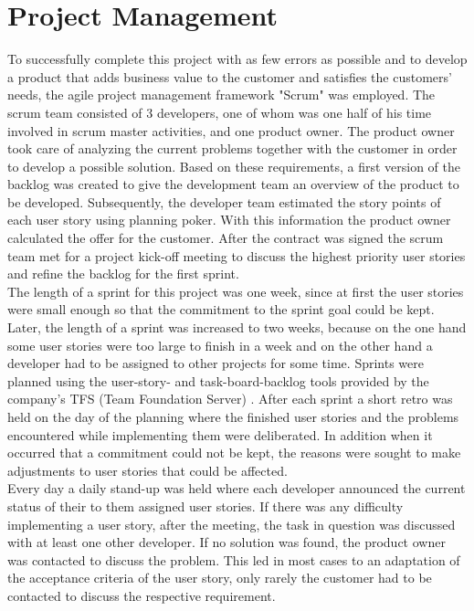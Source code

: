 \documentclass[Bachelor,BIF,english]{twbook}
\begin{document}
\section{Project Management}
To successfully complete this project with as few errors as possible and to develop a product that adds business value to the customer and satisfies the customers' needs, the agile project management framework "Scrum" \cite{Scrum} was employed. The scrum team consisted of 3 developers, one of whom was one half of his time involved in scrum master activities, and one product owner. The product owner took care of analyzing the current problems together with the customer in order to develop a possible solution. Based on these requirements, a first version of the backlog was created to give the development team an overview of the product to be developed. Subsequently, the developer team estimated the story points of each user story using planning poker. With this information the product owner calculated the offer for the customer. After the contract was signed the scrum team met for a project kick-off meeting to discuss the highest priority user stories and refine the backlog for the first sprint.
\\[\baselineskip]
The length of a sprint for this project was one week, since at first the user stories were small enough so that the commitment to the sprint goal could be kept. Later, the length of a sprint was increased to two weeks, because on the one hand some user stories were too large to finish in a week and on the other hand a developer had to be assigned to other projects for some time. Sprints were planned using the user-story- and task-board-backlog tools provided by the company's TFS (Team Foundation Server) \cite{TFS}. After each sprint a short retro was held on the day of the planning where the finished user stories and the problems encountered while implementing them were deliberated. In addition when it occurred that a commitment could not be kept, the reasons were sought to make adjustments to user stories that could be affected. 
\\[\baselineskip]
Every day a daily stand-up was held where each developer announced the current status of their to them assigned user stories. If there was any difficulty implementing a user story, after the meeting, the task in question was discussed with at least one other developer. If no solution was found, the product owner was contacted to discuss the problem. This led in most cases to an adaptation of the acceptance criteria of the user story, only rarely the customer had to be contacted to discuss the respective requirement. 
\end{document}
